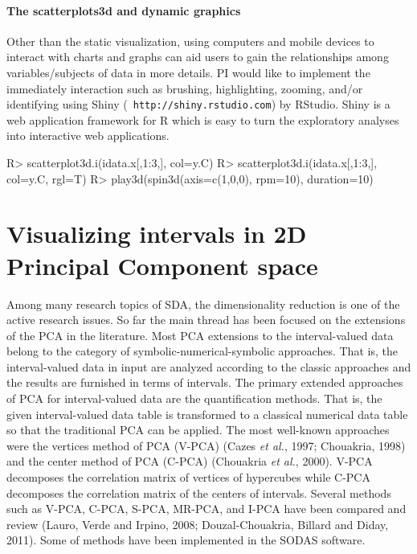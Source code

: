 \documentclass[article]{jss}
\begin{document}
\paragraph{The scatterplots3d and dynamic graphics}
Other than the static visualization, using computers and
mobile devices to interact with charts and graphs can aid
users to gain the relationships among variables/subjects of
data in more details. PI would like to implement the
immediately interaction such as brushing, highlighting,
zooming, and/or identifying using {\sf Shiny} ({\tt
http://shiny.rstudio.com}) by RStudio. {\sf Shiny} is a web
application framework for {\sf R} which is easy to turn the
exploratory analyses into interactive web applications.

\begin{CodeChunk}
\begin{CodeInput}
R> scatterplot3d.i(idata.x[,1:3,], col=y.C)
R> scatterplot3d.i(idata.x[,1:3,], col=y.C, rgl=T)
R> play3d(spin3d(axis=c(1,0,0), rpm=10), duration=10)  
\end{CodeInput}
\end{CodeChunk}






\section{Visualizing intervals in 2D Principal Component space}\label{sec:pca}
Among many research topics of SDA, the dimensionality
reduction is one of the active research issues. So far the
main thread has been focused on the extensions of the PCA
in the literature. 
Most PCA extensions to the interval-valued
data belong to the category of symbolic-numerical-symbolic
approaches. That is, the interval-valued data in input are
analyzed according to the classic approaches and the
results are furnished in terms of intervals. The primary
extended approaches of PCA for interval-valued data are the
quantification methods. That is, the given interval-valued
data table is transformed to a classical numerical data
table so that the traditional PCA can be applied. The most
well-known approaches were the vertices method of PCA
(V-PCA) (Cazes {\it et al.}, 1997; Chouakria, 1998) and the
center method of PCA (C-PCA) (Chouakria {\it et al.},
2000). V-PCA decomposes the correlation matrix of vertices
of hypercubes while C-PCA decomposes the correlation matrix
of the centers of intervals. Several
methods such as V-PCA, C-PCA, S-PCA, MR-PCA, and I-PCA have
been compared and review (Lauro, Verde and Irpino, 2008;
Douzal-Chouakria, Billard and Diday, 2011). Some of methods
have been implemented in the SODAS software. 
\end{document}
